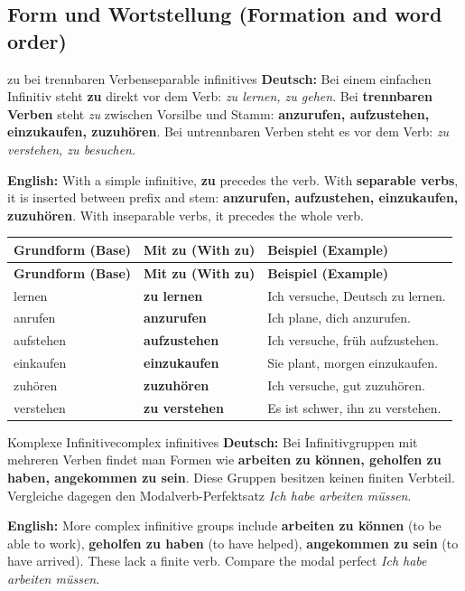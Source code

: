 \documentclass[a4paper,11pt]{article}
\newcommand{\GermanText}[1]{\textbf{Deutsch: }#1\par}
\newcommand{\EnglishText}[1]{{\small\color{SoftGray}\textbf{English: }#1\par}}
\newcommand{\TableHead}[1]{\color{white}\textbf{#1}}
\begin{document}
\subsection{Form und Wortstellung (Formation and word order)}
\begin{grammarentry}{zu bei trennbaren Verben}{separable infinitives}
\GermanText{Bei einem einfachen Infinitiv steht \textbf{zu} direkt vor dem Verb: \emph{zu lernen, zu gehen}. Bei \textbf{trennbaren Verben} steht \emph{zu} zwischen Vorsilbe und Stamm: \textbf{anzurufen, aufzustehen, einzukaufen, zuzuhören}. Bei untrennbaren Verben steht es vor dem Verb: \emph{zu verstehen, zu besuchen}.}
\EnglishText{With a simple infinitive, \textbf{zu} precedes the verb. With \textbf{separable verbs}, it is inserted between prefix and stem: \textbf{anzurufen, aufzustehen, einzukaufen, zuzuhören}. With inseparable verbs, it precedes the whole verb.}
\end{grammarentry}
\begin{longtable}{>{\raggedright\arraybackslash}p{2.9cm}>{\raggedright\arraybackslash}p{3.6cm}>{\raggedright\arraybackslash}p{8.3cm}}
\rowcolor{HeaderBlueDark}\TableHead{Grundform (Base)} & \TableHead{Mit zu (With zu)} & \TableHead{Beispiel (Example)}\\
\endfirsthead
\rowcolor{HeaderBlueDark}\TableHead{Grundform (Base)} & \TableHead{Mit zu (With zu)} & \TableHead{Beispiel (Example)}\\
\endhead
lernen & \textbf{zu lernen} & Ich versuche, Deutsch zu lernen.\\
anrufen & \textbf{anzurufen} & Ich plane, dich anzurufen.\\
aufstehen & \textbf{aufzustehen} & Ich versuche, früh aufzustehen.\\
einkaufen & \textbf{einzukaufen} & Sie plant, morgen einzukaufen.\\
zuhören & \textbf{zuzuhören} & Ich versuche, gut zuzuhören.\\
verstehen & \textbf{zu verstehen} & Es ist schwer, ihn zu verstehen.\\
\end{longtable}
\begin{grammarentry}{Komplexe Infinitive}{complex infinitives}
\GermanText{Bei Infinitivgruppen mit mehreren Verben findet man Formen wie \textbf{arbeiten zu können, geholfen zu haben, angekommen zu sein}. Diese Gruppen besitzen keinen finiten Verbteil. Vergleiche dagegen den Modalverb-Perfektsatz \emph{Ich habe arbeiten müssen}.}
\EnglishText{More complex infinitive groups include \textbf{arbeiten zu können} (to be able to work), \textbf{geholfen zu haben} (to have helped), \textbf{angekommen zu sein} (to have arrived). These lack a finite verb. Compare the modal perfect \emph{Ich habe arbeiten müssen}.}
\end{grammarentry}
\end{document}
